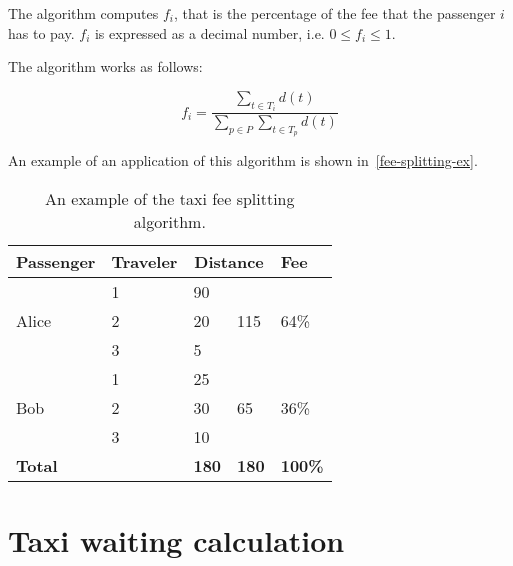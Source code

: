 The algorithm computes $f_i$, that is the percentage of the fee that the passenger $i$ has to pay.
$f_i$ is expressed as a decimal number, i.e. $0 \le f_i \le 1$.

The algorithm works as follows:

\begin{equation}
    f_i = \dfrac
        {\displaystyle \sum_{t \in T_i} d(t)}
        {\displaystyle \sum_{p \in P} \sum_{t \in T_p} d(t)}
\end{equation}

An example of an application of this algorithm is shown in~\autoref{fee-splitting-ex}.

\begin{table}
\begin{center}
\begin{tabular}{ l  l  l  l  l }
    \hline
    \textbf{Passenger} & \textbf{Traveler} & \multicolumn{2}{c}{\textbf{Distance}} & \textbf{Fee} \\
    \hline
    \multirow{3}{*}{Alice} & 1 & 90 & \multirow{3}{*}{115} & \multirow{3}{*}{64\%} \\
    & 2 & 20 & & \\
    & 3 & 5 & & \\
    \hline
    \multirow{3}{*}{Bob} & 1 & 25 & \multirow{3}{*}{65} & \multirow{3}{*}{36\%} \\
    & 2 & 30 & & \\
    & 3 & 10 & & \\
    \hline
    \textbf{Total} & & \textbf{180} & \textbf{180} & \textbf{100\%} \\
    \hline
\end{tabular}
\caption{An example of the taxi fee splitting algorithm.}
\label{fee-splitting-ex}
\end{center}
\end{table}

\section{Taxi waiting calculation}
